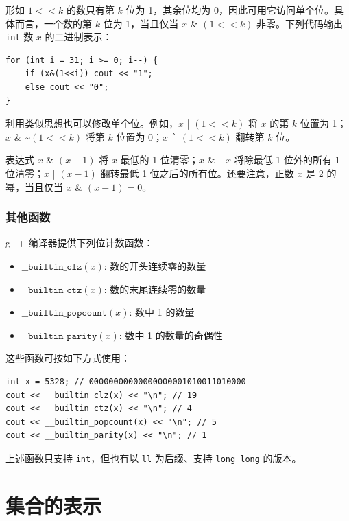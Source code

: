 形如 $1<<k$ 的数只有第 $k$ 位为 1，其余位均为 0，因此可用它访问单个位。具体而言，一个数的第 $k$ 位为 1，当且仅当 $x$ \& $(1<<k)$ 非零。下列代码输出 \texttt{int} 数 $x$ 的二进制表示：

\begin{lstlisting}
for (int i = 31; i >= 0; i--) {
    if (x&(1<<i)) cout << "1";
    else cout << "0";
}
\end{lstlisting}

利用类似思想也可以修改单个位。例如，$x$ | $(1<<k)$ 将 $x$ 的第 $k$ 位置为 1；$x$ \& \textasciitilde $(1<<k)$ 将第 $k$ 位置为 0；$x$ $\XOR$ $(1<<k)$ 翻转第 $k$ 位。

表达式 $x$ \& $(x-1)$ 将 $x$ 最低的 1 位清零；$x$ \& $-x$ 将除最低 1 位外的所有 1 位清零；$x$ | $(x-1)$ 翻转最低 1 位之后的所有位。还要注意，正数 $x$ 是 2 的幂，当且仅当 $x$ \& $(x-1)=0$。

\subsubsection*{其他函数}

g++ 编译器提供下列位计数函数：

\begin{itemize}
\item
$\texttt{\_\_builtin\_clz}(x)$:
数的开头连续零的数量
\item
$\texttt{\_\_builtin\_ctz}(x)$:
数的末尾连续零的数量
\item
$\texttt{\_\_builtin\_popcount}(x)$:
数中 1 的数量
\item
$\texttt{\_\_builtin\_parity}(x)$:
数中 1 的数量的奇偶性
\end{itemize}
\begin{samepage}

这些函数可按如下方式使用：
\begin{lstlisting}
int x = 5328; // 00000000000000000001010011010000
cout << __builtin_clz(x) << "\n"; // 19
cout << __builtin_ctz(x) << "\n"; // 4
cout << __builtin_popcount(x) << "\n"; // 5
cout << __builtin_parity(x) << "\n"; // 1
\end{lstlisting}
\end{samepage}

上述函数只支持 \texttt{int}，但也有以 \texttt{ll} 为后缀、支持 \texttt{long long} 的版本。

\section{集合的表示}

